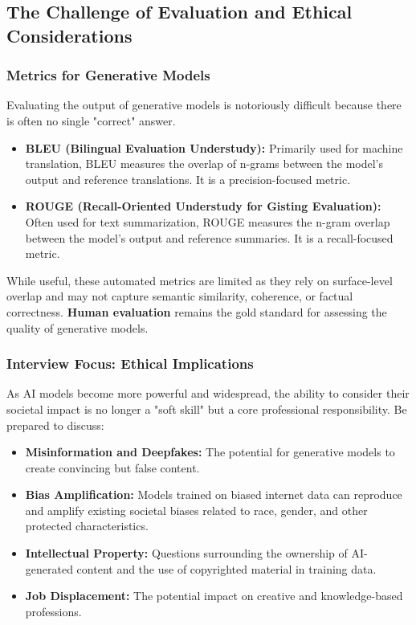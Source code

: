 \documentclass[11pt,a4paper]{article}
\begin{document}
\subsection{The Challenge of Evaluation and Ethical Considerations}

\subsubsection{Metrics for Generative Models}

Evaluating the output of generative models is notoriously difficult because there is often no single "correct" answer.
\begin{itemize}
    \item \textbf{BLEU (Bilingual Evaluation Understudy):} Primarily used for machine translation, BLEU measures the overlap of n-grams between the model's output and reference translations. It is a precision-focused metric.
    \item \textbf{ROUGE (Recall-Oriented Understudy for Gisting Evaluation):} Often used for text summarization, ROUGE measures the n-gram overlap between the model's output and reference summaries. It is a recall-focused metric.
\end{itemize}

While useful, these automated metrics are limited as they rely on surface-level overlap and may not capture semantic similarity, coherence, or factual correctness. \textbf{Human evaluation} remains the gold standard for assessing the quality of generative models.

\subsubsection{Interview Focus: Ethical Implications}

As AI models become more powerful and widespread, the ability to consider their societal impact is no longer a "soft skill" but a core professional responsibility. Be prepared to discuss:
\begin{itemize}
    \item \textbf{Misinformation and Deepfakes:} The potential for generative models to create convincing but false content.
    \item \textbf{Bias Amplification:} Models trained on biased internet data can reproduce and amplify existing societal biases related to race, gender, and other protected characteristics.
    \item \textbf{Intellectual Property:} Questions surrounding the ownership of AI-generated content and the use of copyrighted material in training data.
    \item \textbf{Job Displacement:} The potential impact on creative and knowledge-based professions.
\end{itemize}
\end{document}
